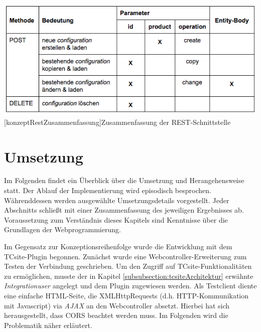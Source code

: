 \documentclass[12pt,a4paper,bibliography=totocnumbered,listof=totoc]{scrartcl}
\begin{document}
\vspace{1em}
\begin{minipage}{\linewidth}
	\centering
	\includegraphics[width=1\linewidth]{Abbildungen/konzeptRestZusammenfassung.png}
	[konzeptRestZusammenfassung]{Zusammenfassung der REST-Schnittstelle}
	\label{fig:konzeptRestZusammenfassung}
\end{minipage}
\vspace{1em}

\pagebreak

\section{Umsetzung}
\label{section:Umsetzung}
Im Folgenden findet ein Überblick über die Umsetzung und Herangehensweise statt. Der Ablauf der Implementierung wird episodisch besprochen. Währenddessen werden ausgewählte Umsetzungsdetails vorgestellt. Jeder Abschnitts schließt mit einer Zusammenfassung des jeweiligen Ergebnisses ab. Voraussetzung zum Verständnis dieses Kapitels sind Kenntnisse über die Grundlagen der Webprogrammierung.

Im Gegensatz zur Konzeptionsreihenfolge wurde die Entwicklung mit dem TCsite-Plugin begonnen. Zunächst wurde eine Webcontroller-Erweiterung zum Testen der Verbindung geschrieben. Um den Zugriff auf TCsite-Funktionalitäten zu ermöglichen, musste der in Kapitel \ref{subsubsection:tcsiteArchitektur} erwähnte \emph{Integrationuser} angelegt und dem Plugin zugewiesen werden. Als Testclient diente eine einfache HTML-Seite, die XMLHttpRequests (d.h. HTTP-Kommunikation mit Javascript) via  \emph{AJAX} an den Webcontroller absetzt. Hierbei hat sich herausgestellt, dass  \ac{CORS} beachtet werden muss. Im Folgenden wird die Problematik näher erläutert.
\end{document}
